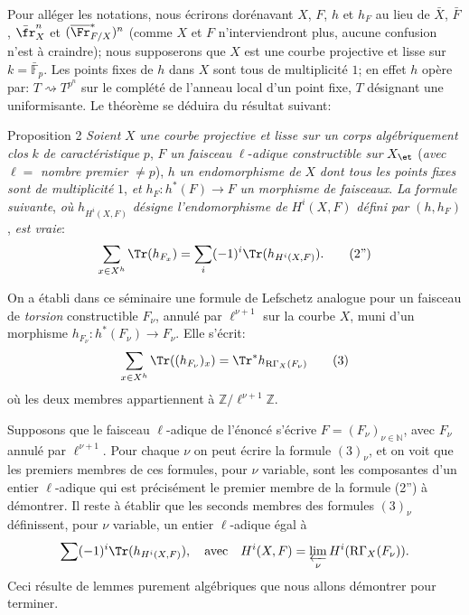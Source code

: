 Pour alléger les notations, nous écrirons dorénavant $X$, $F$, $h$ et $h_F$ au lieu de $\bar X$, $\bar F$, $\bar{\fr}_X^n$ et $(\overline{\Fr}^*_{F/X})^n$ (comme $X$ et $F$ n'interviendront plus, aucune confusion n'est à craindre); nous supposerons que $X$ est une courbe projective et lisse sur $k=\bar{\mathbb{F}}_p$. Les points fixes de $h$ dans $X$ sont tous de multiplicité $1$; en effet $h$ opère par: $T\rightsquigarrow T^{p^n}$ sur le complété de l'anneau local d'un point fixe, $T$ désignant une uniformisante. Le théorème se déduira du résultat suivant:

\begin{statement}{Proposition 2}
\emph{Soient} $X$ \emph{une courbe projective et lisse sur un corps algébriquement clos} $k$ \emph{de caractéristique} $p$, $F$ \emph{un faisceau}
$\ell$-\emph{adique constructible sur} $X_{\et}$ (\emph{avec} $\ell=$ \emph{nombre premier} $\ne p$), $h$ \emph{un endomorphisme de} $X$ \emph{dont tous les points fixes sont de multiplicité} $1$, \emph{et} $h_F:h^*(F)\to F$ \emph{un morphisme de faisceaux}. \emph{La formule suivante}, \emph{où} $h_{H^i(X,F)}$ \emph{désigne l'endomorphisme de} $H^i(X,F)$ \emph{défini par} $(h,h_F)$, \emph{est vraie}:
\[
\sum_{x\in X^h}\Tr(h_{F_x})=\sum_i(-1)^i\Tr(h_{H^i(X,F)}).
\tag{2''}
\]
\end{statement}

On a établi dans ce séminaire une formule de Lefschetz analogue pour un faisceau de \emph{torsion} constructible $F_\nu$, annulé par $\ell^{\nu+1}$ sur la courbe $X$, muni d'un morphisme $h_{F_\nu}:h^*(F_\nu)\to F_\nu$. Elle s'écrit:
\[
\sum_{x\in X^h}\Tr((h_{F_\nu})_x)=\Tr^*h_{\mathrm{R}\Gamma_X(F_\nu)}
\tag{3}
\]
où les deux membres appartiennent à $\mathbb{Z}/\ell^{\nu+1}\mathbb{Z}$.

Supposons que le faisceau $\ell$-adique de l'énoncé s'écrive $F=(F_\nu)_{\nu\in\mathbb{N}}$, avec $F_\nu$ annulé par $\ell^{\nu+1}$. Pour chaque $\nu$ on peut écrire la formule $(3)_\nu$, et on voit que les premiers membres de ces formules, pour $\nu$ variable, sont les composantes d'un entier $\ell$-adique qui est précisément le premier membre de la formule (2'') à démontrer. Il reste à établir que les seconds membres des formules $(3)_\nu$ définissent, pour $\nu$ variable, un entier $\ell$-adique égal à
\[
\sum(-1)^i\Tr(h_{H^i(X,F)}),
\quad\text{avec}\quad
H^i(X,F)=\varprojlim_\nu H^i(\mathrm{R}\Gamma_X(F_\nu)).
\]
Ceci résulte de lemmes purement algébriques que nous allons démontrer pour terminer.

